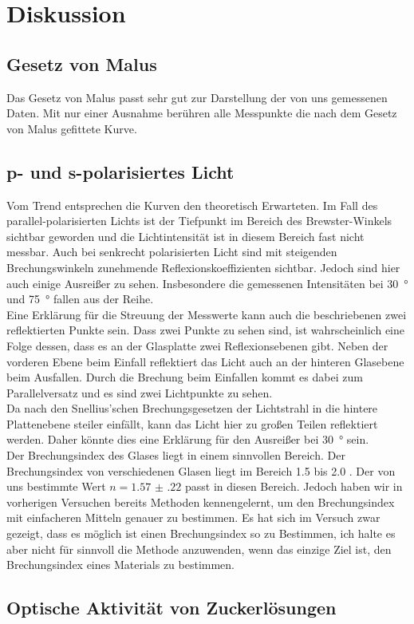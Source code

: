 \section{Diskussion} 
\subsection{Gesetz von Malus}
Das Gesetz von Malus passt sehr gut zur Darstellung der von uns gemessenen Daten. Mit nur einer Ausnahme berühren alle Messpunkte die nach dem Gesetz von Malus gefittete Kurve. 

\subsection{p- und s-polarisiertes Licht}
Vom Trend entsprechen die Kurven den theoretisch Erwarteten. Im Fall des parallel-polarisierten Lichts ist der Tiefpunkt im Bereich des Brewster-Winkels sichtbar geworden und die Lichtintensität ist in diesem Bereich fast nicht messbar. Auch bei senkrecht polarisierten Licht sind mit steigenden Brechungswinkeln zunehmende Reflexionskoeffizienten sichtbar. Jedoch sind hier auch einige Ausreißer zu sehen. Insbesondere die gemessenen Intensitäten bei \SI{30}{\degree} und \SI{75}{\degree} fallen aus der Reihe. \\
Eine Erklärung für die Streuung der Messwerte kann auch die beschriebenen zwei reflektierten Punkte sein. Dass zwei Punkte zu sehen sind, ist wahrscheinlich eine Folge dessen, dass es an der Glasplatte zwei Reflexionsebenen gibt. Neben der vorderen Ebene beim Einfall reflektiert das Licht auch an der hinteren Glasebene beim Ausfallen. Durch die Brechung beim Einfallen kommt es dabei zum Parallelversatz und es sind zwei Lichtpunkte zu sehen. \\
Da nach den Snellius'schen Brechungsgesetzen der Lichtstrahl in die hintere Plattenebene steiler einfällt, kann das Licht hier zu großen Teilen reflektiert werden. Daher könnte dies eine Erklärung für den Ausreißer bei \SI{30}{\degree} sein. \\
Der Brechungsindex des Glases liegt in einem sinnvollen Bereich. Der Brechungsindex von verschiedenen Glasen liegt im Bereich \num{1,5} bis \num{2.0} \cite{wiki:brech}. Der von uns bestimmte Wert $ n = \num{1.57(22)} $ passt in diesen Bereich. Jedoch haben wir in vorherigen Versuchen bereits Methoden kennengelernt, um den Brechungsindex mit einfacheren Mitteln genauer zu bestimmen. Es hat sich im Versuch zwar gezeigt, dass es möglich ist einen Brechungsindex so zu Bestimmen, ich halte es aber nicht für sinnvoll die Methode anzuwenden, wenn das einzige Ziel ist, den Brechungsindex eines Materials zu bestimmen.

\subsection{Optische Aktivität von Zuckerlösungen}